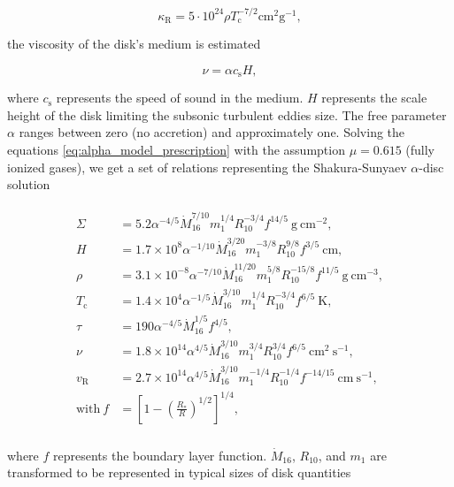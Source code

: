     \begin{equation}
        \kappa_{\mathrm{R}} = 5 \cdot 10^{24} \rho T_{\mathrm{c}}^{-7/2} \si{\cm^2 \gram^{-1}},
    \end{equation}


    the viscosity of the disk's medium is estimated

    \begin{equation}
        \nu = \alpha c_{\mathrm{s}} H,
    \end{equation}

    where $c_{\mathrm{s}}$ represents the speed of sound in the medium. $H$ represents the scale height of the disk limiting the subsonic turbulent eddies size. The free parameter $\alpha$ ranges between zero (no accretion) and approximately one. Solving the equations \eqref{eq:alpha_model_prescription} with the assumption $\mu = 0.615$ (fully ionized gases), we get a set of relations representing the Shakura-Sunyaev $\alpha$-disc solution \citep{acpow}  

    \begin{align}
    \begin{split}
    \Sigma &= 5.2 \alpha^{-4/5} \dot{M}^{7/10}_{16} m^{1/4}_1 R^{-3/4}_{10} f^{14/5}\ \mathrm{g\ cm^{-2}}, \\
    H &= 1.7 \times 10^8 \alpha^{-1/10} \dot{M}^{3/20}_{16} m^{-3/8}_1 R^{9/8}_{10} f^{3/5}\ \mathrm{cm}, \\
    \rho &= 3.1 \times 10^{-8} \alpha^{-7/10} \dot{M}^{11/20}_{16} m^{5/8}_1 R^{-15/8}_{10} f^{11/5}\ \mathrm{g\ cm^{-3}}, \\
    T_{\mathrm{c}} &= 1.4 \times 10^4 \alpha^{-1/5} \dot{M}^{3/10}_{16} m^{1/4}_1 R^{-3/4}_{10} f^{6/5}\ \mathrm{K}, \\
    \tau &= 190 \alpha^{-4/5} \dot{M}^{1/5}_{16} f^{4/5}, \\
    \nu	&= 1.8 \times 10^{14} \alpha^{4/5} \dot{M}^{3/10}_{16} m^{3/4}_1 R^{3/4}_{10} f^{6/5}\ \mathrm{cm^2\ s^{-1}},  \\
    v_{\mathrm{R}}	&= 2.7 \times 10^{14} \alpha^{4/5} \dot{M}^{3/10}_{16} m^{-1/4}_1 R^{-1/4}_{10} f^{-14/15}\ \mathrm{cm\ s^{-1}},  \\
    \mathrm{with}\ f &= \left[ 1 - \left( \frac{R_*}{R} \right)^{1/2} \right]^{1/4}, \\
    \end{split}
    \label{eq:alpha_model_solution}
    \end{align}

    where $f$ represents the boundary layer function. $\dot{M}_{16}$, $R_{10}$, and $m_1$ are transformed to be represented in typical sizes of disk quantities

